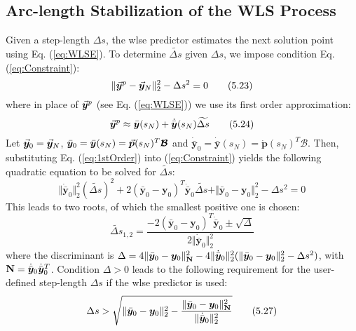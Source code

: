 \subsection{Arc-length Stabilization of the WLS Process}\label{CH5-S2SS3}

Given a step-length $\Delta s$, the \acrshort{wlse} predictor estimates the 
next solution point using Eq. (\ref{eq:WLSE}). To determine $\widetilde{\Delta 
s}$ 
given $\Delta s$, we impose condition Eq. (\ref{eq:Constraint}):
\begin{equation}
	\Vert \vec{\bm{y}}^p-\vec{\bm{y}}_N\Vert_2^2-\Delta s^2 = 0
	\tag{5.23}\label{eq:Constraint}
\end{equation}
where in place of $\vec{\bm{y}}^p$ (see Eq. (\ref{eq:WLSE})) we use its first order 
approximation:
\begin{equation}
	\vec{\bm{y}}^p\approx 
	\bar{\bm{y}}(s_N)+\dot{\bar{\bm{y}}}(s_N)\widetilde{\Delta s}
	\tag{5.24}\label{eq:1stOrder}
\end{equation}
Let $\vec{\bm{y}}_0=\vec{\bm{y}}_N$, $\bar{\bm{y}}_0 = \bar{\bm{y}}(s_N) =
\vec{\bm{p}}(s_N)^T\bm{\mathcal{B}}$ and $\dot{\bar{\bm{y}}}_0 = 
\dot{\bar{\bm{y}}}(s_N) = \dot{\bm{p}}(s_N)^T\bm{\mathcal{B}}$. Then,
substituting Eq. (\ref{eq:1stOrder}) into (\ref{eq:Constraint}) yields the 
following
quadratic equation to be solved for $\widetilde{\Delta s}$:
\begin{equation}
	\Vert\dot{\bar{\bm{y}}}_0\Vert_2^2(\widetilde{\Delta s})^2+
	2(\bar{\bm{y}}_0-\bm{y}_0)^T\dot{\bar{\bm{y}}}_0 \widetilde{\Delta s}+
	\Vert \bar{\bm{y}}_0-\bm{y}_0\Vert_2^2-\Delta s^2=0
	\tag{5.25}\label{eq:QUADRATIC_STAB}
\end{equation}
This leads to two roots, of which the smallest positive one is chosen:
\begin{equation}
	\widetilde{\Delta s}_{1,2} =
	\dfrac{-2(\bar{\bm{y}}_0-\bm{y}_0)^T\dot{\bar{\bm{y}}}_0\pm\sqrt{\Delta}}
	{2\Vert\dot{\bar{\bm{y}}}_0\Vert_2^2}
	\tag{5.26}\label{eq:ROOTS}
\end{equation}
where the discriminant is $\Delta = 4\Vert
\bar{\bm{y}}_0-\bm{y}_0\Vert^2_{\mathbf{N}} -
4\Vert\dot{\bar{\bm{y}}}_0\Vert_2^2(\Vert
\bar{\bm{y}}_0-\bm{y}_0\Vert_2^2-\Delta s^2)$, with $\mathbf{N} = 
\dot{\bar{\bm{y}}}_0\dot{\bar{\bm{y}}}_0^T$. Condition $\Delta > 0$ leads to
the following requirement for the user-defined step-length $\Delta s$ if the
\acrshort{wlse} predictor is used:
\begin{equation}
	\Delta s > \sqrt{\Vert \bar{\bm{y}}_0-\bm{y}_0\Vert_2^2-
		\dfrac{\Vert 
		\bar{\bm{y}}_0-\bm{y}_0\Vert^2_{\mathbf{N}}}{\Vert\dot{\bar{\bm{y}}}_0
			\Vert_2^2}}
	\tag{5.27}\label{eq:DSREQ}
\end{equation}


